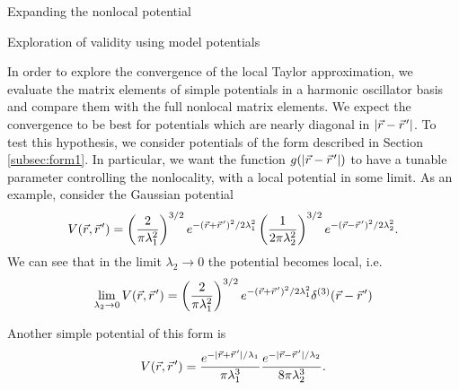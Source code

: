 \begin{section}{Expanding the nonlocal potential}
\begin{section}{Exploration of validity using model potentials \label{sec:toyModel}}

In order to explore the convergence of the local Taylor approximation, we evaluate the matrix elements of simple potentials in a harmonic oscillator basis and compare them with the full nonlocal matrix elements.  We expect the convergence to be best for potentials which are nearly diagonal in $|\vec{r}-\vec{r}\mkern2mu'|$. To test this hypothesis, we consider potentials of the form described in Section \ref{subsec:form1}. In particular, we want the function $g(|\vec{r}-\vec{r}\mkern2mu'|)$ to have a tunable parameter controlling the nonlocality, with a local potential in some limit. As an example, consider the Gaussian potential
\begin{equation}\label{eq:gaussToy}
V(\vec{r},\vec{r}\mkern2mu')=\left(\frac{2}{\pi\lambda_1^2}\right)^{3/2}e^{-(\vec{r}+\vec{r}\mkern2mu')^2/2\lambda_1^2} \left(\frac{1}{2\pi\lambda_2^2}\right)^{3/2}e^{-(\vec{r}-\vec{r}\mkern2mu')^2/2\lambda_2^2}.
\end{equation}
We can see that in the limit $\lambda_2\rightarrow 0$ the potential becomes local, i.e.
\begin{equation}
\lim_{\lambda_2\rightarrow0}V(\vec{r},\vec{r}\mkern2mu')=\left(\frac{2}{\pi\lambda_1^2}\right)^{3/2}e^{-(\vec{r}+\vec{r}\mkern2mu')^2/2\lambda_1^2}\delta^{(3)}(\vec{r}-\vec{r}\mkern2mu')
\end{equation}

Another simple potential of this form is
\begin{equation}
V(\vec{r},\vec{r}\mkern2mu')=\frac{e^{-|\vec{r}+\vec{r}\mkern2mu'|/\lambda_1}}{\pi\lambda_1^3}\frac{e^{-|\vec{r}-\vec{r}\mkern2mu'|/\lambda_2}}{8\pi\lambda_2^3}.
\end{equation}


\end{section}
\end{section}
